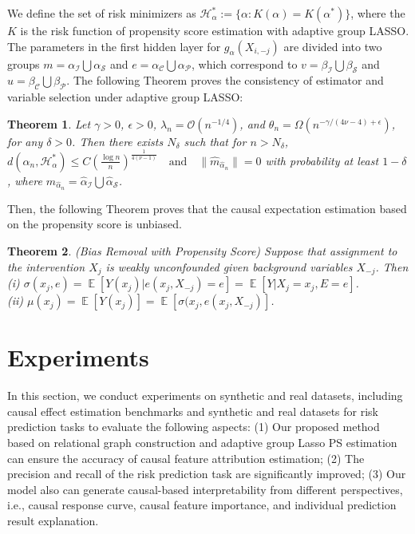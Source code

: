 \documentclass[letterpaper]{article} %
\newcommand{\mc}{\mathcal}
\DeclareMathOperator{\E}{\mathbb{E}}
\newtheorem{theorem}{Theorem}
\theoremstyle{definition}
\theoremstyle{remark}
\begin{document}
We define the set of risk minimizers as
$\mc{H}^*_{\alpha}:= \{\alpha: K(\alpha) = K(\alpha^*)\}$, where the $K$ is the risk function of propensity score estimation with adaptive group LASSO. The parameters in the first hidden layer for $g_\alpha(X_{i,-j})$ are divided into two groups $ m =  \alpha_\mathcal{I} \bigcup  \alpha_\mathcal{S}$ and $ e=  \alpha_\mathcal{C} \bigcup  \alpha_\mathcal{P}$, which correspond to $v = \beta_\mathcal{I} \bigcup \beta_\mathcal{S}$ and $u = \beta_\mathcal{C} \bigcup \beta_\mathcal{P}$. The following Theorem proves the consistency of estimator and variable selection under adaptive group LASSO:
\begin{theorem}
Let $\gamma>0$, $\epsilon>0$, $\lambda_n = \mathcal{O}(n^{-1/4})$, and $\theta_n =\Omega (n^{-\gamma/(4\nu -4)+ \epsilon})$, for any $\delta >0$. Then there exists $N_\delta$ such that for $n > N_\delta$, $d(\hat \alpha_n, \mc{H^*_{\alpha}})  \le C \left( \frac{\log n}{n}\right)^{\frac{1}{4(\nu-1)}} \quad \text{and} \quad 
\|\hat{m}_{\hat \alpha_n}\| = 0$ with probability at least $1 -\delta$, where $\hat{m}_{\hat \alpha_n} = \hat{\alpha}_\mathcal{I} \bigcup \hat{\alpha}_\mathcal{S}$.
\label{thm:main}
\end{theorem}

Then, the following Theorem proves that the causal expectation estimation based on the propensity score is unbiased.

\begin{theorem}
\label{thm:bigtheorem}
(Bias Removal with Propensity Score) Suppose that
assignment to the intervention $X_j$ is weakly unconfounded given background variables $X_{-j}$. Then \\
(i) $\sigma(x_j, e) = \E[Y(x_j)|e(x_j, X_{-j}) = e] = \E[Y|X_j = x_j,E = e]$. \\
(ii) $\mu(x_j) = \E[Y(x_j)] = \E[\sigma(x_j, e(x_j, X_{-j})]$.
\end{theorem}


\section{Experiments}

In this section, we conduct experiments on synthetic and real datasets, including causal effect estimation benchmarks and synthetic and real datasets for risk prediction tasks to evaluate the following aspects: (1) Our proposed method based on relational graph construction and adaptive group Lasso PS estimation can ensure the accuracy of causal feature attribution estimation; (2) The precision and recall of the risk prediction task are significantly improved; (3) Our model also can generate causal-based interpretability from different perspectives, i.e., causal response curve, causal feature importance, and individual prediction result explanation. 
\end{document}
